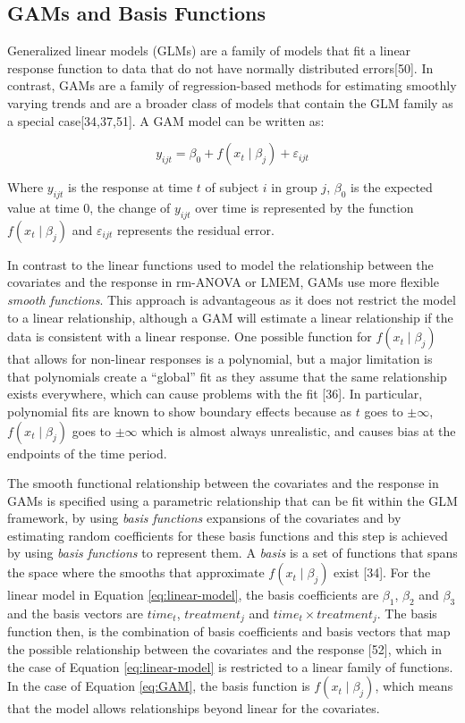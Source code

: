 \documentclass[
]{article}
\begin{document}
\hypertarget{gams-and-basis-functions}{%
\subsection{GAMs and Basis Functions}\label{gams-and-basis-functions}}

Generalized linear models (GLMs) are a family of models that fit a linear response function to data that do not have normally distributed errors{[}50{]}. In contrast, GAMs are a family of regression-based methods for estimating smoothly varying trends and are a broader class of models that contain the GLM family as a special case{[}34,37,51{]}. A GAM model can be written as:

\begin{equation}
  y_{ijt}=\beta_0+f(x_t\mid \beta_j)+\varepsilon_{ijt}
  \label{eq:GAM}
\end{equation}

Where \(y_{ijt}\) is the response at time \(t\) of subject \(i\) in group \(j\), \(\beta_0\) is the expected value at time 0, the change of \(y_{ijt}\) over time is represented by the function \(f(x_t\mid \beta_j)\) and \(\varepsilon_{ijt}\) represents the residual error.

In contrast to the linear functions used to model the relationship between the covariates and the response in rm-ANOVA or LMEM, GAMs use more flexible \emph{smooth functions}. This approach is advantageous as it does not restrict the model to a linear relationship, although a GAM will estimate a linear relationship if the data is consistent with a linear response. One possible function for \(f(x_t\mid \beta_j)\) that allows for non-linear responses is a polynomial, but a major limitation is that polynomials create a ``global'' fit as they assume that the same relationship exists everywhere, which can cause problems with the fit {[}36{]}. In particular, polynomial fits are known to show boundary effects because as \(t\) goes to \(\pm \infty\), \(f(x_t \mid \beta_j)\) goes to \(\pm \infty\) which is almost always unrealistic, and causes bias at the endpoints of the time period.

The smooth functional relationship between the covariates and the response in GAMs is specified using a parametric relationship that can be fit within the GLM framework, by using \emph{basis functions} expansions of the covariates and by estimating random coefficients for these basis functions and this step is achieved by using \emph{basis functions} to represent them. A \emph{basis} is a set of functions that spans the space where the smooths that approximate \(f(x_t \mid \beta_j)\) exist {[}34{]}. For the linear model in Equation \eqref{eq:linear-model}, the basis coefficients are \(\beta_1\), \(\beta_2\) and \(\beta_3\) and the basis vectors are \(time_t\), \(treatment_j\) and \(time_t \times treatment_j\). The basis function then, is the combination of basis coefficients and basis vectors that map the possible relationship between the covariates and the response {[}52{]}, which in the case of Equation \eqref{eq:linear-model} is restricted to a linear family of functions. In the case of Equation \eqref{eq:GAM}, the basis function is \(f(x_t\mid \beta_j)\), which means that the model allows relationships beyond linear for the covariates.
\end{document}
